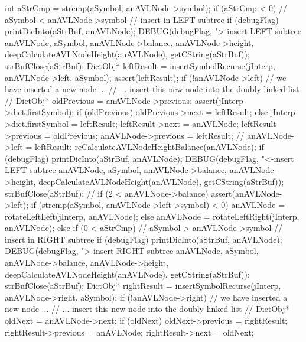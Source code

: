 {  int aStrCmp = strcmp(aSymbol, anAVLNode->symbol);
  if (aStrCmp < 0) {
    // aSymbol < anAVLNode->symbol // insert in LEFT subtree
    if (debugFlag) {
      printDicInto(aStrBuf, anAVLNode);
      DEBUG(debugFlag, ">-insert LEFT subtree %
            anAVLNode, aSymbol, anAVLNode->balance,
            anAVLNode->height, deepCalculateAVLNodeHeight(anAVLNode),
            getCString(aStrBuf));
      strBufClose(aStrBuf);
    }
    DictObj* leftResult =
      insertSymbolRecurse(jInterp, anAVLNode->left, aSymbol);
    assert(leftResult);
    if (!anAVLNode->left) {
      // we have inserted a new node ...
      // ... insert this new node into the doubly linked list
      //
      DictObj* oldPrevious               = anAVLNode->previous;
      assert(jInterp->dict.firstSymbol);
      if (oldPrevious) oldPrevious->next = leftResult;
      else jInterp->dict.firstSymbol     = leftResult;
      leftResult->next                   = anAVLNode;
      leftResult->previous               = oldPrevious;
      anAVLNode->previous                = leftResult;
      //
    }
    anAVLNode->left = leftResult;
    reCalculateAVLNodeHeightBalance(anAVLNode);
    if (debugFlag) {
      printDicInto(aStrBuf, anAVLNode);
      DEBUG(debugFlag, "<-insert LEFT subtree %
          anAVLNode, aSymbol, anAVLNode->balance,
          anAVLNode->height, deepCalculateAVLNodeHeight(anAVLNode),
          getCString(aStrBuf));
      strBufClose(aStrBuf);
    }
    //
    if (2 < anAVLNode->balance) {
      assert(anAVLNode->left);
      if (strcmp(aSymbol, anAVLNode->left->symbol) < 0) {
        anAVLNode = rotateLeftLeft(jInterp, anAVLNode);
      } else {
        anAVLNode = rotateLeftRight(jInterp, anAVLNode);
      }
    }
  } else if (0 < aStrCmp) {
    // aSymbol > anAVLNode->symbol // insert in RIGHT subtree
    if (debugFlag) {
      printDicInto(aStrBuf, anAVLNode);
      DEBUG(debugFlag, ">-insert RIGHT subtree %
          anAVLNode, aSymbol, anAVLNode->balance,
          anAVLNode->height, deepCalculateAVLNodeHeight(anAVLNode),
          getCString(aStrBuf));
      strBufClose(aStrBuf);
    }
    DictObj* rightResult =
      insertSymbolRecurse(jInterp, anAVLNode->right, aSymbol);
    if (!anAVLNode->right) {
      // we have inserted a new node ...
      // ... insert this new node into the doubly linked list
      //
      DictObj* oldNext               = anAVLNode->next;
      if (oldNext) oldNext->previous = rightResult;
      rightResult->previous          = anAVLNode;
      rightResult->next              = oldNext;
}}}
